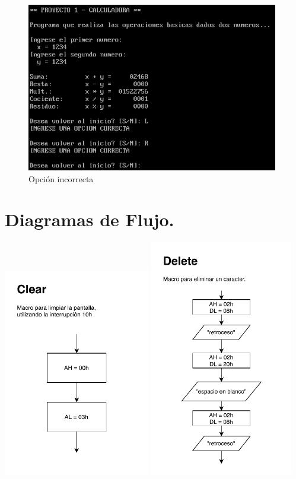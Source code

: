 \documentclass[letter,12 pt,titlepage]{article}
\begin{document}
    \begin{figure}[H]
    \centering
    \includegraphics[width=0.98\textwidth]{img/08.png}
    \caption{Opción incorrecta}
    \end{figure}

    \newpage
    \section{Diagramas de Flujo.}
    \includegraphics[width=0.48\textwidth]{img/diagramas/p01-Clear}
    \includegraphics[width=0.47\textwidth]{img/diagramas/p01-Delete}
\end{document}
